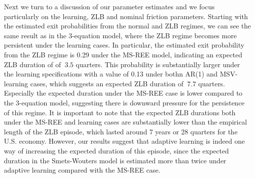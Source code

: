 \documentclass[12pt,reqno]{article}
\numberwithin{equation}{section}
\begin{document}
Next we turn to a discussion of our parameter estimates and we focus particularly on the learning, ZLB and nominal friction parameters. Starting with the estimated exit probabilities from the normal and ZLB regimes, we can see the same result as in the 3-equation model, where the ZLB regime becomes more persistent under the learning cases. In particular, the estimated exit probability from the ZLB regime is 0.29 under the MS-REE model, indicating an expected ZLB duration of of $~3.5$ quarters. This probability is substantially larger under the learning specifications with a value of 0.13 under bothn AR(1) and MSV-learning cases, which suggests an expected ZLB duration of $~7.7$ quarters. Especially the expected duration under the MS-REE case is lower compared to the 3-equation model, suggesting there is downward pressure for the persistence of this regime. It is important to note that the expected ZLB durations both under the MS-REE and learning cases are substantially lower than the empirical length of the ZLB episode, which lasted around 7 years or 28 quarters for the U.S. economy. However, our results suggest that adaptive learning is indeed one way of increasing the expected duration of this episode, since the expected duration in the Smets-Wouters model is estimated more than twice under adaptive learning compared with the MS-REE case. \\
\noindent
\end{document}
